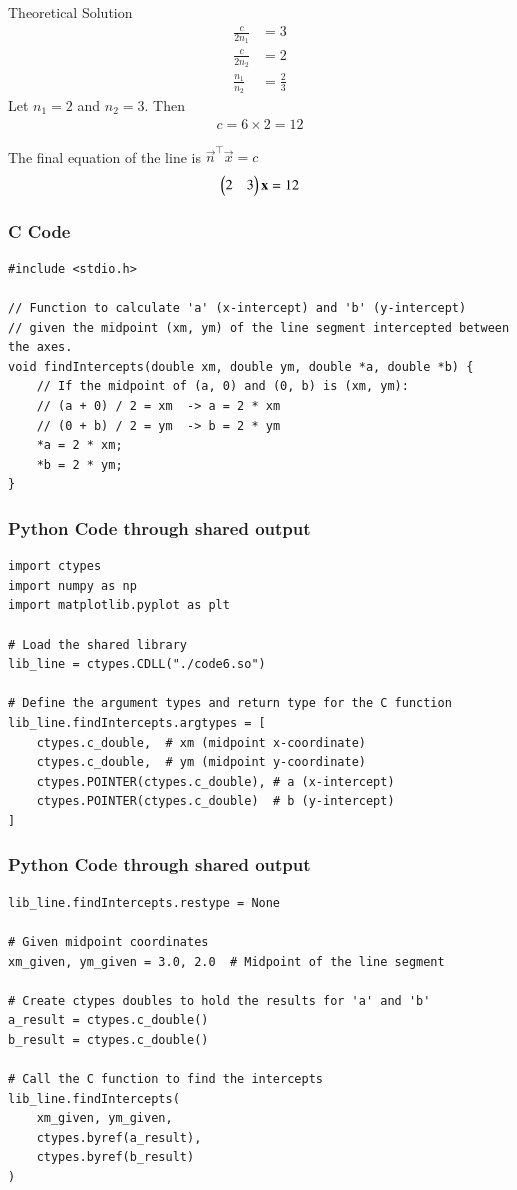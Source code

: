 \documentclass{beamer}
\begin{document}
\begin{frame}{Theoretical Solution}
\begin{align}
\frac{c}{2n_1}&=3\\
\frac{c}{2n_2}&=2\\
\frac{n_1}{n_2} &= \frac{2}{3}
\end{align}
Let $n_1=2$ and $n_2=3$.
Then
\begin{align}
c = 6 \times 2 = 12
\end{align}

The final equation of the line is $\vec{n}^\top \vec{x} = c$
\begin{align}
\begin{pmatrix}2 & 3\end{pmatrix} \mathbf{x} = 12
\end{align}
\end{frame}

\begin{frame}[fragile]
\frametitle{C Code}
\begin{lstlisting}
#include <stdio.h>

// Function to calculate 'a' (x-intercept) and 'b' (y-intercept)
// given the midpoint (xm, ym) of the line segment intercepted between the axes.
void findIntercepts(double xm, double ym, double *a, double *b) {
    // If the midpoint of (a, 0) and (0, b) is (xm, ym):
    // (a + 0) / 2 = xm  -> a = 2 * xm
    // (0 + b) / 2 = ym  -> b = 2 * ym
    *a = 2 * xm;
    *b = 2 * ym;
}
\end{lstlisting}
\end{frame}

\begin{frame}[fragile]
\frametitle{Python Code through shared output}
\begin{lstlisting}
import ctypes
import numpy as np
import matplotlib.pyplot as plt

# Load the shared library
lib_line = ctypes.CDLL("./code6.so")

# Define the argument types and return type for the C function
lib_line.findIntercepts.argtypes = [
    ctypes.c_double,  # xm (midpoint x-coordinate)
    ctypes.c_double,  # ym (midpoint y-coordinate)
    ctypes.POINTER(ctypes.c_double), # a (x-intercept)
    ctypes.POINTER(ctypes.c_double)  # b (y-intercept)
]
\end{lstlisting}
\end{frame}

\begin{frame}[fragile]
\frametitle{Python Code through shared output}
\begin{lstlisting}
lib_line.findIntercepts.restype = None

# Given midpoint coordinates
xm_given, ym_given = 3.0, 2.0  # Midpoint of the line segment

# Create ctypes doubles to hold the results for 'a' and 'b'
a_result = ctypes.c_double()
b_result = ctypes.c_double()

# Call the C function to find the intercepts
lib_line.findIntercepts(
    xm_given, ym_given,
    ctypes.byref(a_result),
    ctypes.byref(b_result)
)
\end{lstlisting}
\end{frame}
\end{document}
